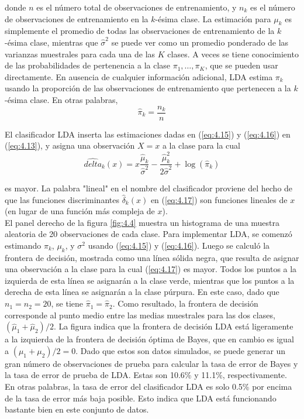 donde $n$ es el número total de observaciones de entrenamiento, y $n_k$ es el número de observaciones de entrenamiento en la $k$-ésima clase. La estimación para $\mu_k$ es simplemente el promedio de todas las observaciones de entrenamiento de la $k$-ésima clase, mientras que $\hat{\sigma}^2$ se puede ver como un promedio ponderado de las varianzas muestrales para cada una de las $K$ clases. A veces se tiene conocimiento de las probabilidades de pertenencia a la clase $\pi_1, \ldots, \pi_K$, que se pueden usar directamente. En ausencia de cualquier información adicional, LDA estima $\pi_k$ usando la proporción de las observaciones de entrenamiento que pertenecen a la $k$-ésima clase. En otras palabras,
\begin{equation}
\hat{\pi}_k = \frac{n_k}{n}
\label{eq:4.16}
\end{equation}

El clasificador LDA inserta las estimaciones dadas en (\ref{eq:4.15}) y (\ref{eq:4.16}) en (\ref{eq:4.13}), y asigna una observación $X = x$ a la clase para la cual
\begin{equation}
\hat{delta}_k(x) = x \frac{\hat{\mu}_k}{\hat{\sigma}^2} - \frac{\hat{\mu}_k^2}{2\hat{\sigma}^2} + \log(\hat{\pi}_k)
\label{eq:4.17}
\end{equation}

es mayor. La palabra "lineal" en el nombre del clasificador proviene del hecho de que las funciones discriminantes $\hat{\delta}_k(x)$ en (\ref{eq:4.17}) son funciones lineales de $x$ (en lugar de una función más compleja de $x$). \\

El panel derecho de la figura \ref{fig:4.4} muestra un histograma de una muestra aleatoria de 20 observaciones de cada clase. Para implementar LDA, se comenzó estimando $\pi_k$, $\mu_k$, y $\sigma^2$ usando (\ref{eq:4.15}) y (\ref{eq:4.16}). Luego se calculó la frontera de decisión, mostrada como una línea sólida negra, que resulta de asignar una observación a la clase para la cual (\ref{eq:4.17}) es mayor. Todos los puntos a la izquierda de esta línea se asignarán a la clase verde, mientras que los puntos a la derecha de esta línea se asignarán a la clase púrpura. En este caso, dado que $n_1 = n_2 = 20$, se tiene $\hat{\pi}_1 = \hat{\pi}_2$. Como resultado, la frontera de decisión corresponde al punto medio entre las medias muestrales para las dos clases, $(\hat{\mu}_1 + \hat{\mu}_2)/2$. La figura indica que la frontera de decisión LDA está ligeramente a la izquierda de la frontera de decisión óptima de Bayes, que en cambio es igual a $(\mu_1 + \mu_2)/2 = 0$. Dado que estos son datos simulados, se puede generar un gran número de observaciones de prueba para calcular la tasa de error de Bayes y la tasa de error de prueba de LDA. Estas son 10.6\% y 11.1\%, respectivamente. En otras palabras, la tasa de error del clasificador LDA es solo 0.5\% por encima de la tasa de error más baja posible. Esto indica que LDA está funcionando bastante bien en este conjunto de datos. \\

